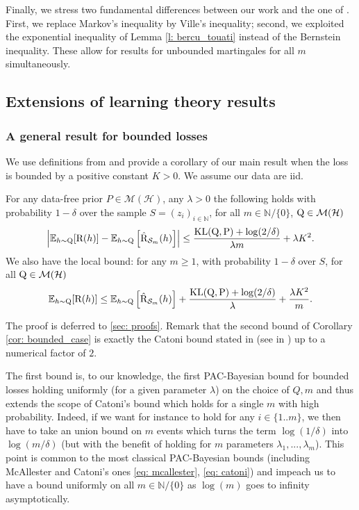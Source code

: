 Finally, we stress two fundamental differences between our work and the one of \citet{seldin2012bandit}. First, we replace Markov's inequality by Ville's inequality; second, we exploited the exponential inequality of Lemma \ref{l: bercu_touati} instead of the Bernstein inequality. These allow for results for unbounded martingales for all $m$ simultaneously.


\subsection{Extensions of learning theory results}


\subsubsection{A general result for bounded losses}


We use definitions from  and provide a corollary of our main result when the loss is bounded by a positive constant $K>0$. We assume our data are iid.
\begin{corollary}
\label{cor: bounded_case}
For any data-free prior $P\in \mathcal{M}(\mathcal{H})$, any $\lambda>0$ the following holds with probability $1-\delta$ over the sample $S=(z_i)_{i\in\mathbb{N}}$, for all $m\in\mathbb{N}/\{0\}$, $\mathrm{Q}\in\mathcal{M}(\mathcal{H})$
\[ \left | \mathbb{E}_{h\sim \mathrm{Q}} [\text{R}(h)] -  \mathbb{E}_{h\sim \mathrm{Q}} \left[\hat{\text{R}}_{\mathcal{S}_m}(h) \right] \right |  \leq \frac{\operatorname{KL}(\mathrm{Q},\mathrm{P}) +\log(2/\delta)}{\lambda m } + \lambda K^2.  \]
We also have the local bound: for any $m\geq 1$, with probability $1-\delta$ over $S$, for all $\mathrm{Q}\in\mathcal{M}(\mathcal{H})$
\[ \mathbb{E}_{h\sim \mathrm{Q}} [\text{R}(h)] \leq  \mathbb{E}_{h\sim \mathrm{Q}} \left[\hat{\text{R}}_{\mathcal{S}_m}(h) \right] + \frac{\operatorname{KL}(\mathrm{Q},\mathrm{P}) +\log(2/\delta)}{\lambda} + \frac{\lambda K^2}{m}.  \]
\end{corollary}
The proof is deferred to \cref{sec: proofs}. Remark that the second bound of Corollary \ref{cor: bounded_case} is exactly the Catoni bound stated in \citet{alquier2016properties} (see  in ) up to a numerical factor of $2$.


The first bound is, to our knowledge, the first PAC-Bayesian bound for bounded losses holding uniformly (for a given parameter $\lambda$) on the choice of $Q,m$ and thus extends the scope of Catoni's bound which holds for a single $m$ with high probability.  Indeed, if we want for instance  to hold for any $i\in\{1..m\}$, we then have to take an union bound on $m$ events which turns the term $\log(1/\delta)$ into $\log(m/\delta)$ (but with the benefit of holding for $m$ parameters $\lambda_1,...,\lambda_m$). This point is common to the most classical PAC-Bayesian bounds
(including McAllester and Catoni's ones \eqref{eq: mcallester}, \eqref{eq: catoni})
and impeach us to have a bound uniformly on all $m\in\mathbb{N}/\{0\}$ as $\log(m)$ goes to infinity asymptotically.


